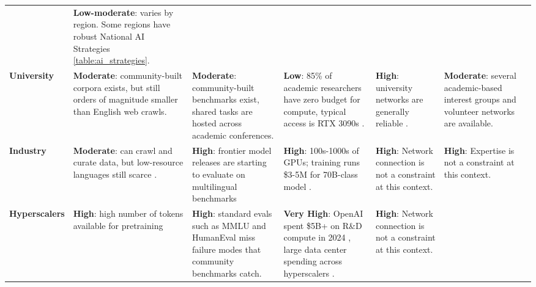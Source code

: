 \begin{table}[t]
{\begin{tabular}{@{}p{}p{}p{}p{}p{}p{}p{}@{}}
             & \textbf{Low-moderate}: varies by region. Some regions have robust National AI Strategies \autoref{table:ai_strategies}.                                                                          \\
            \textbf{University}
             & \textbf{Moderate}: community-built corpora exists, but still orders of magnitude smaller than English web crawls.
             & \textbf{Moderate}: community-built benchmarks exist, shared tasks are hosted across academic conferences.
             & \textbf{Low}: 85\% of academic researchers have zero budget for compute, typical access is RTX 3090s \citep{khandelwal2025k}.
             & \textbf{High}: university networks are generally reliable \citep{Wierenga2005EduroamPP,deoliveira2024evaluationeapusageauthenticating}.
             & \textbf{Moderate}: several academic-based interest groups and volunteer networks are available.                                                                                                  \\
            \textbf{Industry}
             & \textbf{Moderate}: can crawl and curate data, but low-resource languages still scarce \citep{pava2025mind}.
             & \textbf{High}: frontier model releases are starting to evaluate on multilingual benchmarks \citep[\textit{inter alia}]{gemmateam2025gemma3technicalreport}
             & \textbf{High}: 100s-1000s of GPUs; training runs \$3-5M for 70B-class model \citep{maslej2025artificialintelligenceindexreport}.
             & \textbf{High}: Network connection is not a constraint at this context.
             & \textbf{High}: Expertise is not a constraint at this context.                                                                                                                                    \\
            \textbf{Hyperscalers}
             & \textbf{High}: high number of tokens available for pretraining \citep[\textit{inter alia}]{grattafiori2024llama3herdmodels}
             & \textbf{High}: standard evals such as MMLU and HumanEval miss failure modes that community benchmarks catch.
             & \textbf{Very High}: OpenAI spent \$5B+ on R\&D compute in 2024 \citep{epochai2025gpushare}, large data center spending across hyperscalers \citep{epoch2025whatyouneedtoknowaboutaidatacenters}.
             & \textbf{High}: Network connection is not a constraint at this context.

\end{tabular}}
\end{table}

